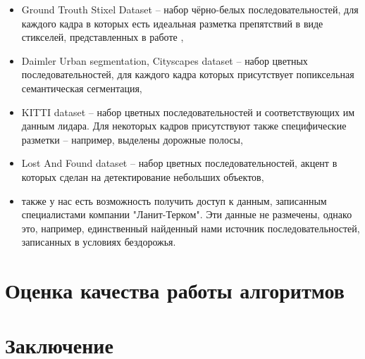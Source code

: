 \documentclass[aps,%
14pt,%
final,%
oneside,
onecolumn,%
musixtex, %
superscriptaddress,%
centertags]{extarticle} %
\begin{document}
\begin{itemize}
    \item Ground Trouth Stixel Dataset -- набор чёрно-белых последовательностей, для каждого кадра в которых есть идеальная разметка препятствий в виде стикселей, представленных в работе \cite{pfeiffer2010efficient},
    \item Daimler Urban segmentation, Cityscapes dataset -- набор цветных последовательностей, для каждого кадра которых присутствует попиксельная семантическая сегментация,
    \item KITTI dataset -- набор цветных последовательностей и соответствующих им данным лидара. Для некоторых кадров присутствуют также специфические разметки -- например, выделены дорожные полосы,
    \item Lost And Found dataset -- набор цветных последовательностей, акцент в которых сделан на детектирование небольших объектов,
    \item также у нас есть возможность получить доступ к данным, записанным специалистами компании "Ланит-Терком". Эти данные не размечены, однако это, например, единственный найденный нами источник последовательностей, записанных в условиях бездорожья.
\end{itemize}

\section{Оценка качества работы алгоритмов}

\section{Заключение}



\newpage
\end{document}
